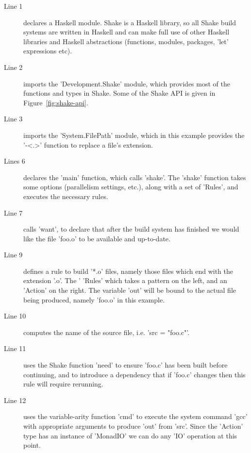 \begin{description}
\item[Line 1] declares a Haskell module. Shake is a Haskell library, so all
Shake build systems are written in Haskell and can make full use of other
Haskell libraries and Haskell abstractions (functions, modules, packages,
\lst'let' expressions etc).
\item[Line 2] imports the \lst'Development.Shake' module, which provides most of
the functions and types in Shake. Some of the Shake API is given in
Figure~\ref{fig:shake-api}.
\item[Line 3] imports the \lst'System.FilePath' module, which in this example
provides the \lst'-<.>' function to replace a file's extension.
\item[Lines 6] declares the \lst'main' function, which calls \lst'shake'. The
\lst'shake' function takes some options (parallelism settings, etc.), along with
a set of \lst'Rules', and executes the necessary rules.
\item[Line 7] calls \lst'want', to declare that after the build system has
finished we would like the file \lst'foo.o' to be available and up-to-date.
\item[Line 9] defines a rule to build \lst'*.o' files, namely those files which
end with the extension \lst'.o'. The \lst'%
\lst'Rules' which takes a pattern on the left, and an \lst'Action' on the
right. The variable \lst'out' will be bound to the actual file being produced,
namely \lst'foo.o' in this example.
\item[Line 10] computes the name of the source file, i.e. \lst'src = "foo.c"'. 
\item[Line 11] uses the Shake function \lst'need' to ensure \lst'foo.c' has been built before
continuing, and to introduce a dependency that if \lst'foo.c' changes then this
rule will require rerunning.
\item[Line 12] uses the variable-arity function \lst'cmd' to execute the system
command \lst'gcc' with appropriate arguments to produce \lst'out' from
\lst'src'. Since the \lst'Action' type has an instance of \lst'MonadIO' we can
do any \lst'IO' operation at this point.
\end{description}

